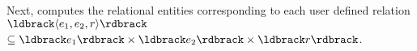 %
Next, \framework computes the relational entities corresponding to each user defined relation $\ldbrack \langle e_1,e_2,r\rangle \rdbrack$
$\subseteq \ldbrack e_1 \rdbrack \times \ldbrack e_2 \rdbrack \times \ldbrack r \rdbrack$.

